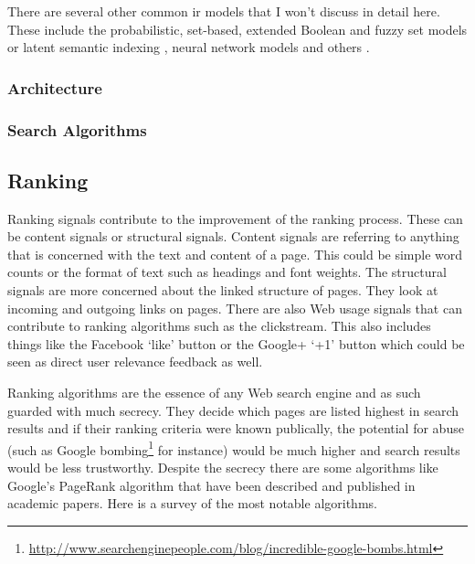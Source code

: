 There are several other common \gls{ir} models that I won't discuss in detail here. These include the probabilistic, set-based, extended Boolean and fuzzy set {\sloppy \autocite{Miyamoto2010, Miyamoto1988, Srinivasan2001, Widyantoro2001, Miyamoto1986}} models or latent semantic indexing \autocite{Deerwester1990}, neural network models and others \autocite{Macdonald2009, Schuetze1998, Schuetze}.



\subsubsection*{Architecture}





\subsubsection*{Search Algorithms}


\subsection{Ranking}

Ranking signals contribute to the improvement of the ranking process. These can be content signals or structural signals. Content signals are referring to anything that is concerned with the text and content of a page. This could be simple word counts or the format of text such as headings and font weights. The structural signals are more concerned about the linked structure of pages. They look at incoming and outgoing links on pages. There are also Web usage signals that can contribute to ranking algorithms such as the clickstream.  This also includes things like the Facebook `like' button or the Google+ `+1' button which could be seen as direct user relevance feedback as well.

Ranking algorithms are the essence of any Web search engine and as such guarded with much secrecy. They decide which pages are listed highest in search results and if their ranking criteria were known publically, the potential for abuse (such as Google bombing\footnote{\url{http://www.searchenginepeople.com/blog/incredible-google-bombs.html}} for instance) would be much higher and search results would be less trustworthy. Despite the secrecy there are some algorithms like Google's PageRank algorithm that have been described and published in academic papers. Here is a survey of the most notable algorithms.

